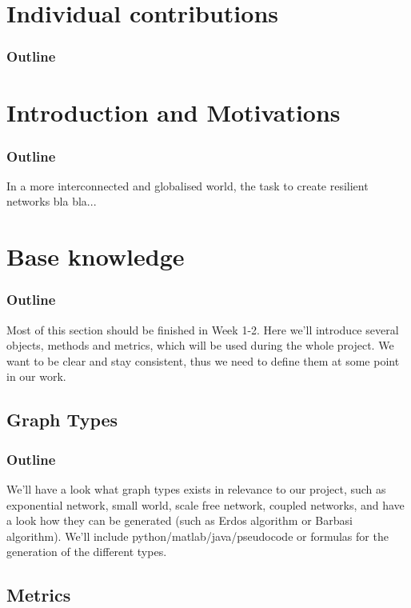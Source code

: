 \documentclass[11pt]{article}
\begin{document}
\tableofcontents

\newpage





\section{Individual contributions}
\subsubsection{Outline}

\section{Introduction and Motivations}
\subsubsection{Outline}
In a more interconnected and globalised world, the task to create resilient networks bla bla...
\section{Base knowledge} 
\subsubsection{Outline}
Most of this section should be finished in Week 1-2. Here we'll introduce several objects, methods and metrics, which will be used during the whole project. We want to be clear and stay consistent, thus we need to define them at some point in our work.
\subsection{Graph Types}
\subsubsection{Outline}
We'll have a look what graph types exists in relevance to our project, such as exponential network, small world, scale free network, coupled networks, and have a look how they can be generated (such as Erdos algorithm or Barbasi algorithm). We'll include python/matlab/java/pseudocode or formulas for the generation of the different types.
\subsection{Metrics}
\end{document}
